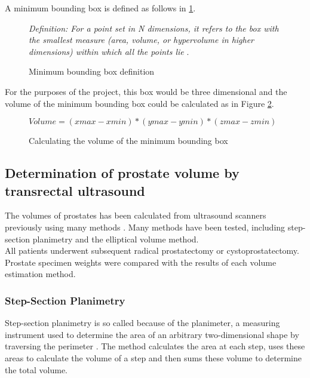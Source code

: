 A minimum bounding box is defined as follows in \ref{fig:bounding_box_definition}.\\

\begin{figure}[h]
\textit{Definition: For a point set in N dimensions, it refers to the box with the smallest measure (area, volume, or hypervolume in higher dimensions) within which all the points lie} \cite{Barequet2001}.
\caption {Minimum bounding box definition}
\label{fig:bounding_box_definition}
\end{figure}

For the purposes of the project, this box would be three dimensional and the volume of the minimum bounding box could be calculated as in Figure \ref{fig:calculating_the_volume_of_the_minimum_bounding_box}.\\

\begin{figure}[h]
\begin{center}
$Volume = (xmax -xmin) * (ymax - ymin) * (zmax - zmin)$
\end{center}
\caption{Calculating the volume of the minimum bounding box}
\label{fig:calculating_the_volume_of_the_minimum_bounding_box}
\end{figure}

\subsection{Determination of prostate volume by transrectal ultrasound}

The volumes of prostates has been calculated from ultrasound scanners previously using many methods \cite{K1991}. 
Many methods have been tested, including step-section planimetry and the elliptical volume method.\\ 

All patients underwent subsequent radical prostatectomy or cystoprostatectomy. Prostate specimen weights were compared with the results of each volume estimation method. 

\subsubsection{Step-Section Planimetry}
Step-section planimetry is so called because of the planimeter, a measuring instrument used to determine the area of an arbitrary two-dimensional shape by traversing the perimeter \cite{Bryant2011}. 
The method calculates the area at each step, uses these areas to calculate the volume of a step and then sums these volume to determine the total volume.\\

